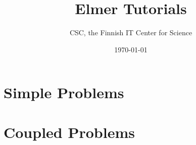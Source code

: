 \documentclass[a4paper,english]{report}    %
\title{\Huge{\bf Elmer Tutorials}}
\author{CSC, the Finnish IT Center for Science}
\date{\today}
\begin{document}
\maketitle





\pagestyle{empty}

\setcounter{secnumdepth}{2}
\setcounter{tocdepth}{1}  %

\tableofcontents


\newpage
\renewcommand{\chaptername}{Tutorial}
\pagestyle{fancy}

\providecommand{\lefthead}{Elmer Tutorials}


\clearpage
{}

\part{Simple Problems}

\graphicspath{{./}{TemperatureAngle/}}


\graphicspath{{./}{TemperatureRadiation/}}


\graphicspath{{./}{ElasticBeam/}}


\graphicspath{{./}{ElasticEigenValues/}}


\graphicspath{{./}{ElasticPlateLinear/}}


\graphicspath{{./}{FlowStepIncompressible/}}


\graphicspath{{./}{FlowStepCompressible/}}


\graphicspath{{./}{Electrostatics/}}


\graphicspath{{./}{AcousticWaves/}}



\part{Coupled Problems}
\end{document}
